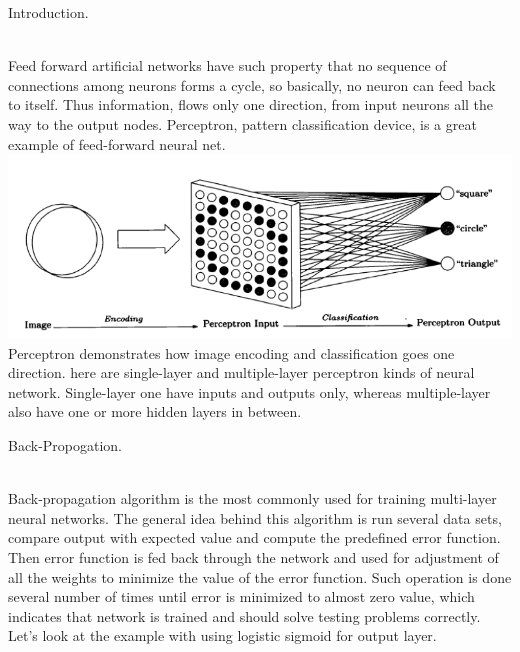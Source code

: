 \documentclass[12pt, letterpaper]{article}
\begin{document}
\begin{enumerate}[label=\Roman*.]
	{\bf \item Introduction.} \\
	
	Feed forward artificial networks have such property that no sequence of connections among neurons forms a cycle, so basically, no neuron can feed back to itself. Thus information, flows only one direction, from input neurons all the way to the output nodes. Perceptron, pattern classification device, is a great example of feed-forward neural net. \\
	{\center \includegraphics[scale=1]{1.png} \\}
	Perceptron demonstrates how image encoding and classification goes one direction. here are single-layer and multiple-layer perceptron kinds of neural network. Single-layer one have inputs and outputs only, whereas multiple-layer also have one or more hidden layers in between.\\
	
	{\bf \item Back-Propogation.} \\
	
	Back-propagation algorithm is the most commonly used for training multi-layer neural networks. The general idea behind this algorithm is run several data sets, compare output with expected value and compute the predefined error function. Then error function is fed back through the network and used for adjustment of all the weights to minimize the value of the error function. Such operation is done several number of times until error is minimized to almost zero value, which indicates that network is trained and should solve testing problems correctly. Let's look at the example with using logistic sigmoid for output layer.\\
	

\end{enumerate}
\end{document}
